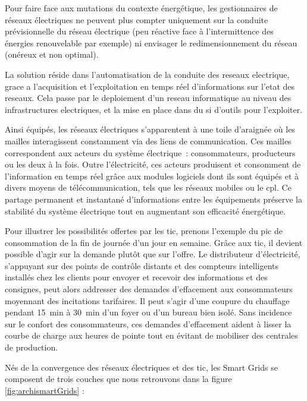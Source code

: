 Pour faire face aux mutations du contexte énergétique, les gestionnaires de 
réseaux électriques ne peuvent plus compter uniquement sur la conduite 
prévisionnelle du réseau électrique (peu réactive face à l'intermittence des 
énergies renouvelable par exemple) ni envisager le redimensionnement du réseau 
(onéreux et non optimal). 

La solution réside dans l'automatisation de la conduite des reseaux electrique, 
grace a l'acquisition et l'exploitation en temps réel d'informations sur l'etat 
des reseaux. Cela passe par le deploiement d'un reseau informatique au niveau 
des infrastructures electriques, et la mise en place dans du \gls{si} d'outils 
pour l'exploiter.

Ainsi équipés, les réseaux électriques s'apparentent à une toile d'araignée où 
les mailles interagissent constamment via des liens de communication. Ces 
mailles correspondent aux acteurs du système électrique~: consommateurs, 
producteurs ou les deux à la fois. Outre l'électricité, ces acteurs produisent 
et consomment de l'information en temps réel grâce aux modules logiciels dont 
ils sont équipés et à divers moyens de télécommunication, tels que les réseaux 
mobiles ou le \gls{cpl}. Ce partage permanent et 
instantané d'informations entre les équipements préserve la stabilité du 
système électrique tout en augmentant son efficacité énergétique.

Pour illustrer les possibilités offertes par les \gls{tic}, prenons l'exemple 
du pic de consommation de la fin de journée d'un jour en semaine. Grâce aux 
\gls{tic}, il devient possible d'agir sur la demande plutôt que sur l'offre. Le
distributeur d'électricité, s'appuyant sur des points de contrôle distants et 
des compteurs intelligents installés chez les clients pour envoyer et recevoir 
des informations et des consignes, peut alors addresser des demandes 
d'effacement aux consommateurs moyennant des incitations tarifaires. Il peut 
s'agir d'une coupure du chauffage pendant 15~min à 30~min d'un foyer ou d'un 
bureau bien isolé. Sans incidence sur le confort des consommateurs, ces 
demandes d'effacement aident à lisser la courbe de charge aux heures de pointe 
tout en évitant de mobiliser des centrales de production. 

Nés de la convergence des réseaux électriques et des \gls{tic}, les Smart Grids 
se composent de trois couches que nous retrouvons dans la figure 
\ref{fig:archismartGrids} :

